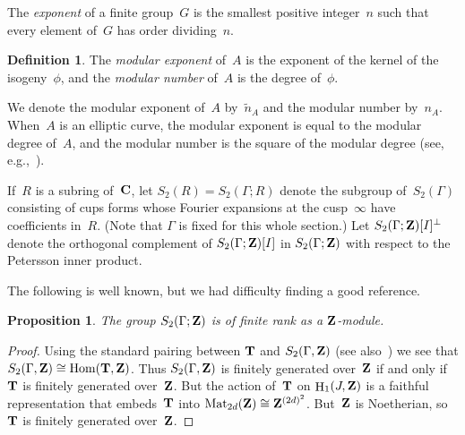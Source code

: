 \documentclass[10pt,twoside]{article}
\newcommand{\Z}{{\bf{Z}}}
\newcommand{\C}{{\bf{C}}}
\newcommand{\T}{{\bf{T}}}
\newcommand{\ra}{\rightarrow}
\newcommand{\na}{{n_{\scriptscriptstyle{A}}}}
\newcommand{\nA}{{n_{\scriptscriptstyle{A}}}}
\newcommand{\nAe}{{\tilde{n}_{\scriptscriptstyle{A}}}}
\newcommand{\Adual}{A^{\vee}}
\newcommand{\Jdual}{J^{\vee}}
\newcommand{\Hom}{{\rm Hom}}
\newcommand{\isom}{\cong}
\renewcommand{\H}{\HHH}
\newtheorem{prop}[lem]{Proposition}
\theoremstyle{definition}
\newtheorem{defi}[lem]{Definition}
\DeclareMathOperator{\Mat}{Mat}
\DeclareMathOperator{\HHH}{H}
\begin{document}

The {\em exponent} of a finite group~$G$ is the smallest positive
integer~$n$ such that every element of~$G$ has order dividing~$n$.

\begin{defi}\label{defi:modular}
The {\em modular exponent} of~$A$ is the exponent of the kernel
of the isogeny~$\phi$, and the {\em modular number} of~$A$ is
the degree of~$\phi$. 
\end{defi}

We denote the modular exponent of~$A$ by~$\nAe$ and
the modular number by~$\nA$. 
When~$A$ is an elliptic curve, the modular
exponent is equal to the modular degree of~$A$,
and the modular number is the square of the modular degree
(see, e.g.,~\cite[p.~278]{abbull}). 

If~$R$ is a subring of~$\C$, 
let $S_2(R)=S_2(\Gamma;R)$ denote the subgroup of~$S_2(\Gamma)$
consisting of cups forms whose Fourier expansions at the cusp~$\infty$
have coefficients in~$R$.  (Note that $\Gamma$ is fixed for this whole
section.)
Let $S_2(\Gamma;\Z)[I]^{\perp}$ denote the orthogonal complement of
$S_2(\Gamma;\Z)[I]$ in $S_2(\Gamma;\Z)$ with respect to the Petersson inner
product. 

The following is well known, but we had difficulty finding
a good reference.
\begin{prop}
The group $S_2(\Gamma;\Z)$ is of finite rank as a $\Z$-module.
\end{prop}
\begin{proof}
  Using the standard pairing between $\T$ and $S_2(\Gamma,\Z)$ (see
  also~\cite[Theorem~2.2]{ribet:modp}) we see that $S_2(\Gamma,\Z)
  \isom \Hom(\T,\Z)$. Thus $S_2(\Gamma,\Z)$ is finitely generated
  over~$\Z$ if and only if~$\T$ is finitely generated over~$\Z$.  But
  the action of~$\T$ on $\H_1(J,\Z)$ is a faithful representation that
  embeds~$\T$ into $\Mat_{2d}(\Z) \isom \Z^{(2d)^2}$.  But~$\Z$ is
  Noetherian, so~$\T$ is finitely generated over~$\Z$.
\end{proof}
\end{document}
